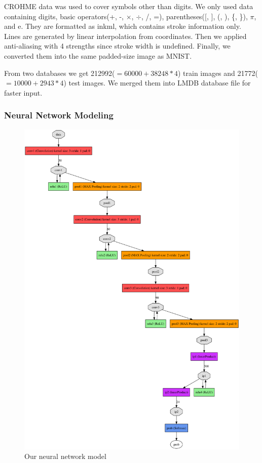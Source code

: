 \documentclass[10pt,twocolumn,letterpaper]{article}
\begin{document}
CROHME data was used to cover symbols other than digits. We only used data containing digits, basic operators(+, -, $\times$, $\div$, /, =), parentheses([, ], (, ), \{, \}), $\pi$, and e. They are formatted as inkml, which contains stroke information only. Lines are generated by linear interpolation from coordinates. Then we applied anti-aliasing with 4 strengths since stroke width is undefined. Finally, we converted them into the same padded-size image as MNIST.

From two databases we get 212992($=60000+38248*4$) train images and 21772($=10000+2943*4$)
test images. We merged them into LMDB database file for faster input.

\subsubsection{Neural Network Modeling}

\begin{figure}[t]
\centering
\includegraphics[width=0.9\linewidth]{img/model.png}
\caption{Our neural network model}
\label{fig:model}
\end{figure}
\end{document}
